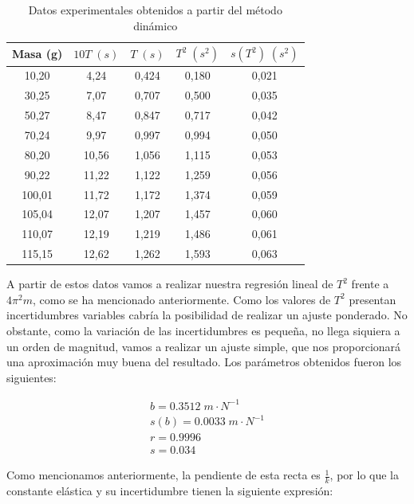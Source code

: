 \documentclass[a4paper,12pt,titlepage]{article}
\begin{document}
\newpage

\begin{table}[h!]
    \centering
    \begin{tabular}{|c|c|c|c|c|}
    \hline
    Masa (g) & $10T \; (s)$ & $T \; (s)$ & $T^2 \; (s^2) $&   $s(T^2) \; (s^2)$\\ \hline
    10,20   & 4,24  & 0,424 & 0,180 & 0,021 \\ \hline
    30,25  & 7,07  & 0,707 & 0,500 & 0,035 \\ \hline
    50,27  & 8,47  & 0,847 & 0,717 & 0,042 \\ \hline
    70,24  & 9,97  & 0,997 & 0,994 & 0,050  \\ \hline
    80,20   & 10,56 & 1,056 & 1,115 & 0,053 \\ \hline
    90,22  & 11,22 & 1,122 & 1,259 & 0,056 \\ \hline
    100,01 & 11,72 & 1,172 & 1,374 & 0,059 \\ \hline
    105,04 & 12,07 & 1,207 & 1,457 & 0,060  \\ \hline
    110,07 & 12,19 & 1,219 & 1,486 & 0,061 \\ \hline
    115,15 & 12,62 & 1,262 & 1,593 & 0,063 \\ \hline
    \end{tabular}
    \caption{Datos experimentales obtenidos a partir del método dinámico}
    \label{Datos dinamico}
\end{table}

A partir de estos datos vamos a realizar nuestra regresión lineal de $T^2$ frente a $4\pi^2m$, como se ha mencionado anteriormente. Como los valores de $T^2$ presentan incertidumbres variables cabría la posibilidad de realizar un ajuste ponderado. No obstante, como la variación de las incertidumbres es pequeña, no llega siquiera a un orden de magnitud, vamos a realizar un ajuste simple, que nos proporcionará una aproximación muy buena del resultado. Los parámetros obtenidos fueron los siguientes:

\begin{equation}
    \begin{gathered}
        b = 0.3512 \; m\cdot N^{-1}\\
        s(b) = 0.0033 \; m\cdot N^{-1}\\
        r =  0.9996 \\
        s =  0.034
    \end{gathered}
\end{equation}

Como mencionamos anteriormente, la pendiente de esta recta es $\frac{1}{k}$, por lo que la constante elástica y su incertidumbre tienen la siguiente expresión:
\end{document}
